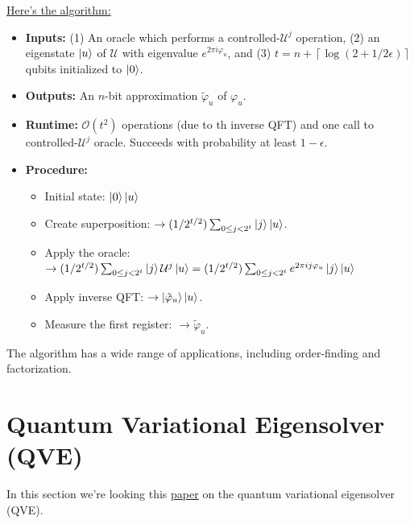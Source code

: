 \documentclass{book}
\theoremstyle{definition}
\newcommand{\lp}{\left(}
\newcommand{\rp}{\right)}
\newcommand{\U}{\mathcal{U}}
\begin{document}
\underline{Here's the algorithm:}
\begin{itemize}
	\item \textbf{Inputs:} (1) An oracle which performs a controlled-$\U^j$ operation, (2) an eigenstate $\ket{u}$ of $\U$ with eigenvalue $e^{2\pi i \varphi_u}$, and (3) $t = n + \left\lceil \log \lp 2 + 1/2\epsilon \rp \right \rceil$ qubits initialized to $\ket{0}$.
	
	
	\item \textbf{Outputs:} An $n$-bit approximation $\tilde\varphi_u$ of $\varphi_u$. 
	
	\item \textbf{Runtime:} $\mathcal{O}(t^2)$ operations (due to th inverse QFT) and one call to controlled-$\U^j$ oracle. Succeeds with probability at least $1-\epsilon$. 
	
	\item \textbf{Procedure:} 
	\begin{itemize}
		\item  Initial state: $\ket{0}\ket{u}$
		
		\item Create superposition: $\to (1/2^{t/2})\sum_{0 \leq j < 2^t}\ket{j}\ket{u}$.
		
		
		\item Apply the oracle:\\ $\to(1/2^{t/2})\sum_{0 \leq j < 2^t}\ket{j}\U^j\ket{u} = (1/2^{t/2})\sum_{0 \leq j < 2^t}e^{2\pi i j\varphi_u}\ket{j}\ket{u}$
		
		
		\item Apply inverse QFT: $\to \ket{\tilde\varphi_u}\ket{u}$. 
		
		\item Measure the first register: $\to \tilde \varphi_u$.
	\end{itemize}
\end{itemize}


The algorithm has a wide range of applications, including order-finding and factorization. 










\newpage


\section{Quantum Variational Eigensolver (QVE)}

In this section we're looking this \href{https://www.ncbi.nlm.nih.gov/pmc/articles/PMC4124861/pdf/ncomms5213.pdf}{\underline{paper}} on the quantum variational eigensolver (QVE). \\
\end{document}
